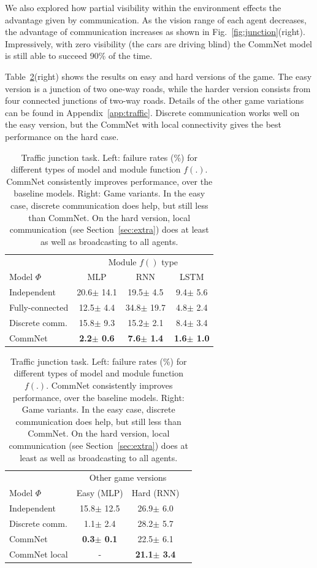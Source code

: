 \documentclass{article}
\newcommand{\fig}[1]{Fig.~\ref{fig:#1}}
\newcommand{\tab}[1]{Table~\ref{tab:#1}}
\newcommand{\secc}[1]{Section~\ref{sec:#1}}
\newcommand{\append}[1]{Appendix~\ref{app:#1}}
\newcommand{\res}[2]{#1{\scriptsize $\pm$ #2} }
\begin{document}
We also explored how partial visibility within
the environment effects the advantage given by communication. As the
vision range of each agent decreases, the advantage of communication
increases as shown in \fig{junction}(right). 
Impressively, with zero visibility (the cars are driving
blind) the CommNet model is still able to succeed 90\% of the time. 

\tab{traffic}(right) shows the results on easy and hard versions of the game.
The easy version is a junction of two one-way roads, while 
the harder version consists from four connected junctions of two-way
roads. Details of the other game variations can be found in \append{traffic}. 
Discrete communication works well on the easy version, but the CommNet
with local connectivity gives the best performance on the hard case.

\begin{table}[b]
\center
\footnotesize
\setlength{\tabcolsep}{4pt}
\begin{tabular}{|l||c|c|c|} \hline
      & \multicolumn{3}{|c|}{Module $f()$ type} \\ 
Model $\Phi$              & MLP & RNN & LSTM \\ \hline
Independent               & \res{20.6}{14.1} & \res{19.5}{4.5} & \res{9.4}{5.6} \\ \hline
Fully-connected          & \res{12.5}{4.4} & \res{34.8}{19.7} & \res{4.8}{2.4} \\ \hline
Discrete comm.           & \res{15.8}{9.3} & \res{15.2}{2.1} & \res{8.4}{3.4}  \\ \hline \hline
CommNet         & \textbf{\res{2.2}{0.6}} & \textbf{\res{7.6}{1.4}} & \textbf{\res{1.6}{1.0}}  \\ \hline
\end{tabular}
\quad
\begin{tabular}{|l||c|c|c} \hline
      & \multicolumn{2}{|c|}{Other game versions} \\ 
Model $\Phi$              & Easy (MLP) & Hard (RNN) \\ \hline
Independent               & \res{15.8}{12.5} & \res{26.9}{6.0} \\ \hline
Discrete comm.          & \res{1.1}{2.4} & \res{28.2}{5.7} \\ \hline \hline
CommNet         & \textbf{\res{0.3}{0.1}}  & \res{22.5}{6.1}  \\ \hline
CommNet local        & -       & \textbf{\res{21.1}{3.4}} \\ \hline
\end{tabular}

\caption{Traffic junction task. Left: failure rates (\%) for
    different types of model and module function
    $f(.)$. CommNet consistently improves performance, over the
    baseline models. Right: Game variants. In the
    easy case, discrete communication does help, but still less than
    CommNet. On the
    hard version, local communication (see \secc{extra}) does at least
    as well as broadcasting to all agents.
}
\label{tab:traffic}
\vspace{-1mm}
\end{table}
\end{document}
